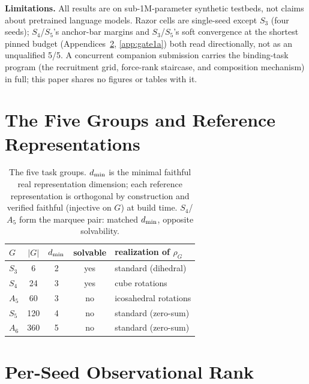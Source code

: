 
\textbf{Limitations.} All results are on sub-1M-parameter synthetic
testbeds, not claims about pretrained language models. Razor cells are
single-seed except $S_3$ (four seeds); $S_4$/$S_5$'s anchor-bar margins
and $S_3$/$S_5$'s soft convergence at the shortest pinned budget
(Appendices~\ref{app:m1}, \ref{app:gate1a}) both read directionally, not
as an unqualified 5/5. A concurrent companion submission carries the
binding-task program (the recruitment grid, force-rank staircase, and
composition mechanism) in full; this paper shares no figures or tables
with it.

\appendix

\section{The Five Groups and Reference Representations}
\label{app:groups}

\begin{table}[h]
\centering
\small
\begin{tabular}{lcccl}
\toprule
$G$ & $|G|$ & $d_{\min}$ & solvable & realization of $\rho_G$ \\
\midrule
$S_3$ & 6   & 2 & yes & standard (dihedral) \\
$S_4$ & 24  & 3 & yes & cube rotations \\
$A_5$ & 60  & 3 & no  & icosahedral rotations \\
$S_5$ & 120 & 4 & no  & standard (zero-sum) \\
$A_6$ & 360 & 5 & no  & standard (zero-sum) \\
\bottomrule
\end{tabular}
\caption{The five task groups. $d_{\min}$ is the minimal faithful real
representation dimension; each reference representation is orthogonal by
construction and verified faithful (injective on $G$) at build time.
$S_4$/$A_5$ form the marquee pair: matched $d_{\min}$, opposite solvability.}
\label{tab:groups}
\end{table}

\section{Per-Seed Observational Rank}
\label{app:m1}


